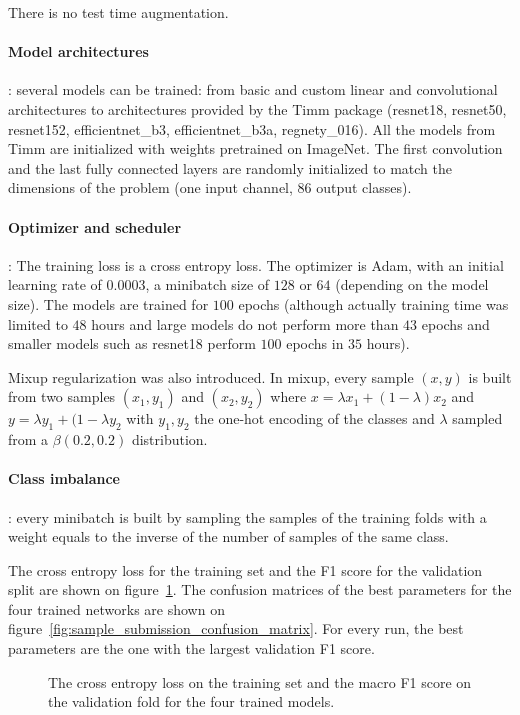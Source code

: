 \documentclass{article}
\begin{document}
There is no test time augmentation.

\paragraph{Model architectures}: several models can be trained: from basic and custom linear and convolutional architectures to architectures provided by the Timm package (resnet18, resnet50, resnet152, efficientnet\_b3, efficientnet\_b3a, regnety\_016). All the models from Timm are initialized with weights pretrained on ImageNet. The first convolution and the last fully connected layers are randomly initialized to match the dimensions of the problem (one input channel, 86 output classes).


\paragraph{Optimizer and scheduler}: The training loss is a cross entropy loss. The optimizer is Adam, with an initial learning rate of $0.0003$, a minibatch size of $128$ or $64$ (depending on the model size). The models are trained for $100$ epochs (although actually training time was limited to $48$ hours and large models do not perform more than $43$ epochs and smaller models such as resnet18 perform $100$ epochs in $35$ hours). 

Mixup regularization was also introduced. In mixup, every sample $(x, y)$ is built from two samples $(x_1, y_1)$ and $(x_2,y_2)$ where $x = \lambda x_1 + (1-\lambda)x_2$ and $y = \lambda y_1 + (1-\lambda y_2$ with $y_1, y_2$ the one-hot encoding of the classes and $\lambda$ sampled from a $\beta(0.2, 0.2)$ distribution.

\paragraph{Class imbalance}: every minibatch is built by sampling the samples of the training folds with a weight equals to the inverse of the number of samples of the same class.

The cross entropy loss for the training set and the F1 score for the validation split are shown on figure~\ref{fig:sample_submission_losses}. The confusion matrices of the best parameters for the four trained networks are shown on figure~\ref{fig:sample_submission_confusion_matrix}. For every run, the best parameters are the one with the largest validation F1 score. 

\begin{figure}[!htbp]
	\caption{\label{fig:sample_submission_losses} The cross entropy loss on the training set and the macro F1 score on the validation fold for the four trained models.}
\end{figure}
\end{document}
